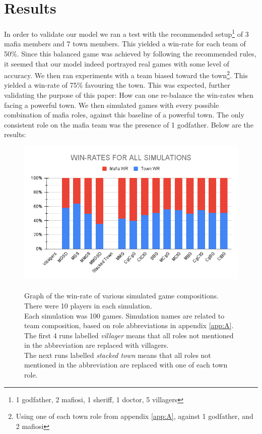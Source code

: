 \section{Results}\label{sec:results}
In order to validate our model we ran a test with the recommended
setup\footnote[1]{1 godfather, 2 mafiosi, 1 sheriff, 1 doctor, 5 villagers} of
3 mafia members and 7 town members\cite{MafiaRules}. This yielded a win-rate
for each team of 50\%. Since this balanced game was achieved by following the
recommended rules, it seemed that our model indeed portrayed real games with
some level of accuracy. We then ran experiments with a team biased toward the
town\footnote{Using one of each town role from appendix \ref{app:A}, against 1
    godfather, and 2 mafiosi}. This yielded a win-rate of 75\% favouring the town.
This was expected, further validating the purpose of this paper: How can one
re-balance the win-rates when facing a powerful town. We then simulated games
with every possible combination of mafia roles, against this baseline of a
powerful town. The only consistent role on the mafia team was the presence of 1
godfather. Below are the results:
\begin{figure}[h]
    \includegraphics[width=1\linewidth]{figures/Winrates}
    \caption{\\Graph of the win-rate of various simulated game compositions.\\
        There were 10 players in each simulation.\\
        Each simulation was 100 games.
        Simulation names are related to team composition, based on role
        abbreviations in appendix \ref{app:A}.\\
        The first 4 runs labelled \textit{villager} means that all roles not
        mentioned in the abbreviation are replaced with villagers.\\
        The next runs labelled \textit{stacked town} means that all roles not
        mentioned in the abbreviation are replaced with	one of each town role.}
    \label{fig:placeholder}
\end{figure}
